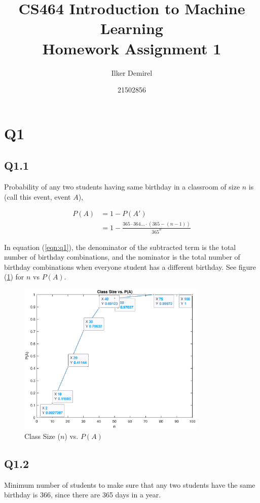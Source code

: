 \documentclass[12pt]{report}
\begin{document}
\title{CS464 Introduction to Machine Learning \\ Homework Assignment 1} 
\author{Ilker Demirel}
\date{21502856}
\maketitle

\section*{Q1}
\subsection*{Q1.1}
Probability of any two students having same birthday in a classroom of size $n$ is (call this event, event $A$),

\begin{align} \label{eqn:q1}
P(A) &= 1 - P(A') \nonumber \\
&= 1 - \frac{365 \cdot 364 \dots \cdot (365 - (n - 1))}{365^n}
\end{align}

In equation (\ref{eqn:q1}), the denominator of the subtracted term is the total number of birthday combinations, and the nominator is the total number of birthday combinations when everyone student has a different birthday. See figure (\ref{fig:q1}) for $n$ vs $P(A)$.

\begin{figure}[h!]
  \includegraphics[width=0.8\textwidth]{q1_1}
  \caption{Class Size ($n$) vs. $P(A)$}
  \label{fig:q1}
\end{figure}

\subsection*{Q1.2}
Minimum number of students to make sure that any two students have the same birthday is 366, since there are 365 days in a year.
\end{document}
